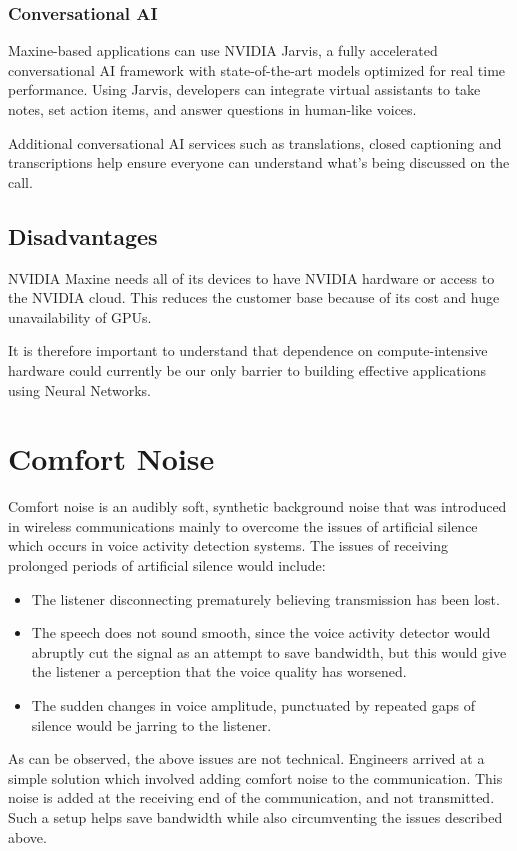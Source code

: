 \subsubsection{Conversational AI}
Maxine-based applications can use NVIDIA Jarvis, a fully accelerated conversational
AI framework with state-of-the-art models optimized for real time performance. Using Jarvis, 
developers can integrate virtual assistants to take notes, set action items, and answer questions 
in human-like voices.

Additional conversational AI services such as translations, closed captioning and transcriptions help 
ensure everyone can understand what’s being discussed on the call.

\subsection{Disadvantages}

NVIDIA Maxine needs all of its devices to have NVIDIA hardware or access to the NVIDIA cloud. 
This reduces the customer base because of its cost and huge unavailability of GPUs.

It is therefore important to understand that dependence on compute-intensive hardware could
currently be our only barrier to building effective applications using Neural Networks.

\section{Comfort Noise}

Comfort noise is an audibly soft, synthetic background noise that was introduced in wireless communications 
mainly to overcome the issues of artificial silence which occurs in voice activity detection systems.
The issues of receiving prolonged periods of artificial silence would include:

\begin{itemize}
    \item The listener disconnecting prematurely believing transmission has been lost.
    \item The speech does not sound smooth, since the voice activity detector would 
    abruptly cut the signal as an attempt to save bandwidth, but this would give the 
    listener a perception that the voice quality has worsened.
    \item The sudden changes in voice amplitude, punctuated by repeated gaps of silence 
    would be jarring to the listener.
\end{itemize}

As can be observed, the above issues are not technical. Engineers arrived at a simple solution which involved adding 
comfort noise to the communication. This noise is added at the receiving end of the communication, and not transmitted.~\cite{ComfortNoise}
Such a setup helps save bandwidth while also circumventing the issues described above.